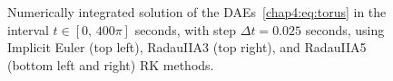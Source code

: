 \begin{figure}[htbp]
  \centering
  \small{}%
  \hspace{0.25cm}%
  \small{}
  \small{}%
  \hspace{0.25cm}%
  \small{}
  \caption{Numerically integrated solution of the \acp{DAE}~\eqref{chap4:eq:torus} in the interval $t \in [0, \, 400\pi]$ seconds, with step $\Delta t = 0.025$ seconds, using Implicit Euler (top left), RadauIIA3 (top right), and RadauIIA5 (bottom left and right) \ac{RK} methods.}
  \label{chap4:fig:torus_integration}
\end{figure}

